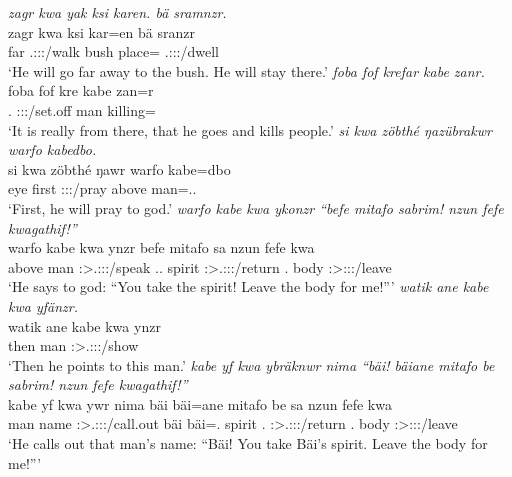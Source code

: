\begin{exe}
	\emph{zagr kwa yak ksi karen. bä sramnzr.}\\
	\gll zagr kwa  ksi kar=en bä sranzr\\
	far {\Fut} \Tsg.\Masc:\Sbj:\Nonpast:\Ipfv/walk bush place={\Loc} \Med{} \Tsg.\Masc:\Sbj:\Irr:\Ipfv/dwell\\
	\trans `He will go far away to the bush. He will stay there.'
	\emph{foba fof krefar kabe zanr.}\\
	\gll foba fof kre kabe zan=r\\
	\Dist.{\Abl} {\Emph} \Stsg:\Sbj:\Irr:\Pfv/set.off man killing=\Purp\\
	\trans `It is really from there, that he goes and kills people.'
	\emph{si kwa zöbthé ŋazübrakwr warfo kabedbo.}\\
	\gll si kwa zöbthé ŋawr warfo kabe=dbo\\
	eye {\Fut} first \Stsg:\Sbj:\Nonpast:\Ipfv/pray above man=\All.\Anim.\Sg\\
	\trans `First, he will pray to god.'
	\emph{warfo kabe kwa ykonzr ``befe mitafo sabrim! nzun fefe kwagathif!''}\\
	\gll warfo kabe kwa ynzr befe mitafo sa nzun fefe kwa\\
	above man {\Fut} \Stsg:\Sbj>\Tsg.\Masc:\Obj:\Nonpast:\Ipfv/speak \Ssg.\Erg.{\Emph} spirit \Stsg:\Sbj>\Tsg.\Masc:\Io:\Imp:\Pfv/return \Fsg.{\Dat} body \Stsg:\Sbj>\Fsg:\Io:\Imp:\Pfv/leave\\
	\trans `He says to god: ``You take the spirit! Leave the body for me!'''
	\emph{watik ane kabe kwa yfänzr.}\\
	\gll watik ane kabe kwa ynzr\\
	then {\Dem} man {\Fut} \Stsg:\Sbj>\Tsg.\Masc:\Obj:\Nonpast:\Ipfv/show\\
	\trans `Then he points to this man.'
	\emph{kabe yf kwa ybräknwr nima ``bäi! bäiane mitafo be sabrim! nzun fefe kwagathif!''}\\
	\gll kabe yf kwa ywr nima bäi bäi=ane mitafo be sa nzun fefe kwa\\
	man name {\Fut} \Stsg:\Sbj>\Tsg.\Masc:\Obj:\Nonpast:\Ipfv/call.out {\Quot} bäi bäi=\Poss.{\Sg} spirit \Ssg.{\Erg} \Stsg:\Sbj>\Tsg.\Masc:\Io:\Imp:\Pfv/return \Fsg.{\Dat} body \Stsg:\Sbj>\Fsg:\Io:\Imp:\Pfv/leave\\
	\trans `He calls out that man's name: ``Bäi! You take Bäi's spirit. Leave the body for me!'''

\end{exe}
